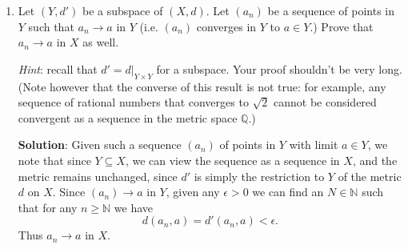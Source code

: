 \documentclass[letterpaper,12pt]{article}
\newcommand{\R}{\mathbb{R}}
\newcommand{\N}{\mathbb{N}}
\begin{document}
\begin{enumerate}
{\bf Solution}: Note that viewing any open interval as a subspace of the metric space $\R$ simply means that we keep the usual distance function on these spaces, so that continuity means the usual notion of continuity from real analysis. Consider the function $\tan:X=(-\pi/2,\pi/2)\to \R$. From basic calculus, we know that $\tan$ is one-to-one on $X$, has range $\R$, and is continuous. Moreover, its inverse is given by the continuous function $\arctan:\R\to X$, so that $X$ and $\R$ are homeomorphic. Given any two intervals $(a,b)$ and $(c,d)$, we can take the linear function
\[
f(x) = \left(\frac{d-c}{b-a}\right)(x-a)+c.
\]
We know that any linear (nonconstant) function is one-to-one and continuous, and we have $f(a)=c$ and $f(d)=b$, which tells us that $f$ is onto the interval $(c,d)$. The inverse of $f$ is $f^{-1}(x) = \left(\dfrac{b-a}{d-c}\right)(x-c)+a$, which is also a linear, and hence continuous, function. Taking one of the two intervals to be $X$, we conclude that any open interval is topologically equivalent to $\R$, since we can compose the map $(a,b)\to X$ with the map $\tan:X\to\R$. (Here we are using without proof the fact that topological equivalence is an equivalence relation, which was one of the textbook exercises.)

Finally, if we want to be thorough, we can note that the interval $(0,\infty)$ is homeomorphic to $\R$ via the homeomorphism given by the natural logarithm (with inverse the exponential function), and any interval of the form $(a,\infty)$ or $(-\infty, a)$ can be identified with $(0,\infty)$ by a simple translation and/or reflection (i.e. $x\mapsto x-a$ or $x\mapsto a-x)$.

\item Let $(Y,d')$ be a subspace of $(X,d)$. Let $(a_n)$ be a sequence of points in $Y$ such that $a_n\to a$ in $Y$ (i.e. $(a_n)$ converges in $Y$ to $a\in Y$.) Prove that $a_n\to a$ in $X$ as well.

{\em Hint}: recall that $d' = d|_{Y\times Y}$ for a subspace. Your proof shouldn't be very long. (Note however that the converse of this result is not true: for example, any sequence of rational numbers that converges to $\sqrt{2}$ cannot be considered convergent as a sequence in the metric space $\mathbb{Q}$.)

\bigskip

{\bf Solution}: Given such a sequence $(a_n)$ of points in $Y$ with limit $a\in Y$, we note that since $Y\subseteq X$, we can view the sequence as a sequence in $X$, and the metric remains unchanged, since $d'$ is simply the restriction to $Y$ of the metric $d$ on $X$. Since $(a_n)\to a$ in $Y$, given any $\epsilon>0$ we can find an $N\in\N$ such that for any $n\geq \N$ we have
\[
d(a_n,a) = d'(a_n,a) <\epsilon.
\]
Thus $a_n\to a$ in $X$.


\end{enumerate}
\end{document}
